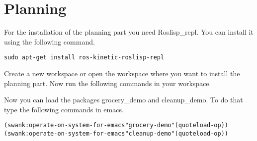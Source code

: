 \documentclass[main.tex]{subfiles}
\begin{document}
	\section{Planning}
	\label{sec:Planning}
	For the installation of the planning part you need Roslisp\_repl.
	You can install it using the following command.
	\begin{lstlisting}
sudo apt-get install ros-kinetic-roslisp-repl 
\end{lstlisting}

	Create a new workspace or open the workspace where you want to install the planning part. Now run the following commands in your workspace.\\
\begin{mdframed}[backgroundcolor=mygray, rightline=false]

\end{mdframed}
	
	Now you can load the packages grocery\_demo and cleanup\_demo.
	To do that type the following commands in emacs.
	\begin{lstlisting}
(swank:operate-on-system-for-emacs"grocery-demo"(quoteload-op))
(swank:operate-on-system-for-emacs"cleanup-demo"(quoteload-op)) 
\end{lstlisting}
	
\end{document}
